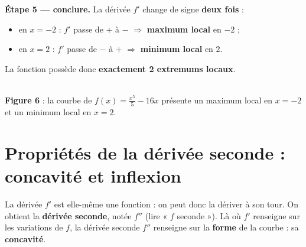 \documentclass[11pt,a4paper]{article}
\begin{document}
\begin{exemple}[$f(x)=\dfrac{x^5}{5}-16x$ — combien d'extremums ?]
\textbf{Étape 5 — conclure.} La dérivée $f'$ change de signe \textbf{deux fois} :
\begin{itemize}[leftmargin=1.6em,topsep=2pt,itemsep=1pt]
  \item en $x=-2$ : $f'$ passe de $+$ à $-$ $\Rightarrow$ \textbf{maximum local} en $-2$ ;
  \item en $x=2$ : $f'$ passe de $-$ à $+$ $\Rightarrow$ \textbf{minimum local} en $2$.
\end{itemize}
La fonction possède donc \textbf{exactement 2 extremums locaux}.
\end{exemple}

\begin{center}
\\[2pt]
{\small\textbf{\textcolor{primary}{Figure 6}} : la courbe de $f(x)=\tfrac{x^5}{5}-16x$ présente un
maximum local en $x=-2$ et un minimum local en $x=2$.}
\end{center}

\section{Propriétés de la dérivée seconde : concavité et inflexion}
\label{sec:der2}
La dérivée $f'$ est elle-même une fonction : on peut donc la dériver à son tour. On obtient la
\textbf{dérivée seconde}, notée $f''$ (lire « $f$ seconde »). Là où $f'$ renseigne sur les variations
de $f$, la dérivée seconde $f''$ renseigne sur la \textbf{forme} de la courbe : sa \textbf{concavité}.
\end{document}
